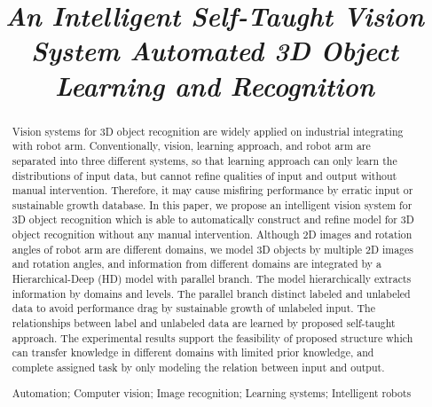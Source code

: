 \documentclass{tADR2e}
\begin{document}


\title{{\itshape An Intelligent Self-Taught Vision System Automated 3D Object Learning and Recognition}}


\maketitle

\begin{abstract}
Vision systems for 3D object recognition are widely applied on industrial integrating with robot arm. Conventionally, vision, learning approach, and robot arm are separated into three different systems, so that learning approach can only learn the distributions of input data, but cannot refine qualities of input and output without manual intervention. Therefore, it may cause misfiring performance by erratic input or sustainable growth database. In this paper, we propose an intelligent vision system for 3D object recognition which is able to automatically construct and refine model for 3D object recognition without any manual intervention. Although 2D images and rotation angles of robot arm are different domains, we model 3D objects by multiple 2D images and rotation angles, and information from different domains are integrated by a Hierarchical-Deep (HD) model with parallel branch. The model hierarchically extracts information by domains and levels. The parallel branch distinct labeled and unlabeled data to avoid performance drag by sustainable growth of unlabeled input. The relationships between label and unlabeled data are learned by proposed self-taught approach. The experimental results support the feasibility of proposed structure which can transfer knowledge in different domains with limited prior knowledge, and complete assigned task by only modeling the relation between input and output.\medskip

\begin{keywords}Automation; Computer vision; Image recognition; Learning systems; Intelligent robots 
\end{keywords}\medskip

\end{abstract}
\end{document}
